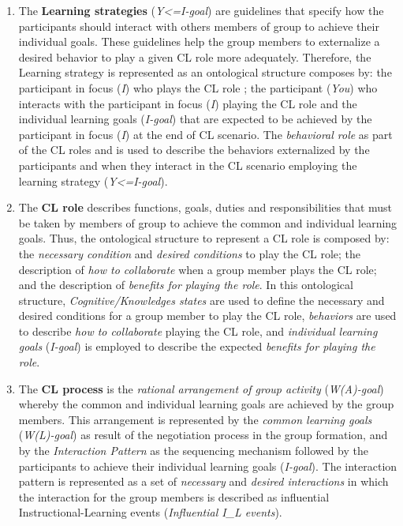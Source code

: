 \begin{enumerate} [label=(\alph*)]

\item
The \textbf{Learning strategies} (\emph{Y<=I-goal}) are guidelines that specify how the participants should interact with others members of group to achieve their individual goals.
These guidelines help the group members to externalize a desired behavior to play a given CL role more adequately. 
Therefore, the Learning strategy is represented as an ontological structure composes by:
the participant in focus (\emph{I}) who plays the CL role ;
the participant (\emph{You}) who interacts with the participant in focus (\emph{I}) playing the CL role  and
the individual learning goals (\emph{I-goal}) that are expected to be achieved by the participant in focus (\emph{I}) at the end of CL scenario.
The \emph{behavioral role} as part of the CL roles  and  is used to describe the behaviors externalized by the participants  and  when they interact in the CL scenario employing the learning strategy (\emph{Y<=I-goal}).

\item
The \textbf{CL role} describes functions, goals, duties and responsibilities that must be taken by members of group to achieve the common and individual learning goals.
Thus, the ontological structure to represent a CL role is composed by:
the \emph{necessary condition} and \emph{desired conditions} to play the CL role;
the description of \emph{how to collaborate} when a group member plays the CL role; and
the description of \emph{benefits for playing the role}.
In this ontological structure,
\emph{Cognitive/Knowledges states} are used to define the necessary and desired conditions for a group member to play the CL role,
\emph{behaviors} are used to describe \emph{how to collaborate} playing the CL role, and
\emph{individual learning goals} (\emph{I-goal}) is employed to describe the expected \emph{benefits for playing the role}.

\item
The \textbf{CL process} is the \emph{rational arrangement of group activity} (\emph{W(A)-goal}) whereby the common and individual learning goals are achieved by the group members.
This arrangement is represented by the \emph{common learning goals} (\emph{W(L)-goal}) as result of the negotiation process in the group formation, and by the \emph{Interaction Pattern} as the sequencing mechanism followed by the participants to achieve their individual learning goals (\emph{I-goal}).
The interaction pattern is represented as a set of \emph{necessary} and \emph{desired interactions} in which the interaction for the group members is described as influential Instructional-Learning events (\emph{Influential I\_L events}).


\end{enumerate}
